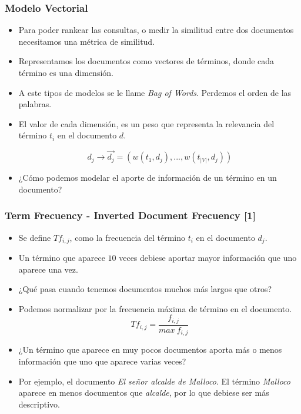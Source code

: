 \documentclass[mathserif]{beamer}
\begin{document}
\begin{frame}\frametitle{Modelo Vectorial}
\footnotesize{
\begin{itemize}
 \item Para poder rankear las consultas, o medir la similitud entre dos documentos necesitamos una métrica de similitud.
 \item Representamos los documentos como vectores de términos, donde cada término es una dimensión.
 \item A este tipos de modelos se le llame \emph{Bag of Words}. Perdemos el orden de las palabras. 
 \item El valor de cada dimensión, es un peso que representa la relevancia del término $t_{i}$ en el documento $d$.

\begin{equation}
 d_{j} \rightarrow \overrightarrow{d_{j}}=(w(t_{1},d_{j}),...,w(t_{|V|},d_{j}))
\end{equation}

\item ¿Cómo podemos modelar el aporte de información de un término en un documento?
 
\end{itemize}

}
 
\end{frame}

\begin{frame}\frametitle{Term Frecuency - Inverted Document Frecuency [1]}
\footnotesize{
\begin{itemize}
 \item Se define $Tf_{i,j}$, como la frecuencia del término $t_{i}$ en el documento $d_{j}$.
 \item Un término que aparece $10$ veces debiese aportar mayor información que uno aparece una vez.
 \item ¿Qué pasa cuando tenemos documentos muchos más largos que otros?
 \item Podemos normalizar por la frecuencia máxima de término en el documento. 
\begin{displaymath}
 Tf_{i,j}=\frac{f_{i,j}}{max \ f_{i,j}}
\end{displaymath}
\item ¿Un término que aparece en muy pocos documentos aporta más o menos información que uno que aparece varias veces?
\item Por ejemplo, el documento \emph{El señor alcalde de Malloco}. El término \emph{Malloco} aparece en menos documentos que \emph{alcalde}, por lo que debiese ser más descriptivo. 
\end{itemize}


} 
\end{frame}
\end{document}
